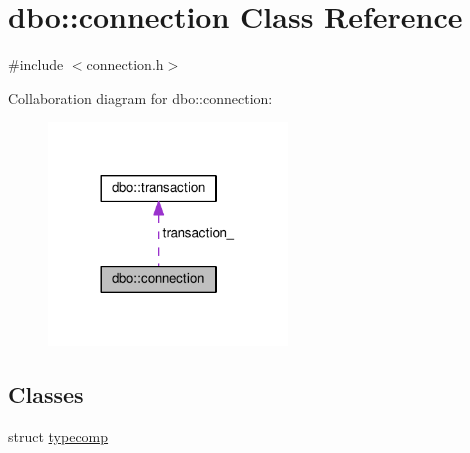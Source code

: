 \hypertarget{classdbo_1_1connection}{\section{dbo\+:\+:connection Class Reference}
\label{classdbo_1_1connection}
}


{\ttfamily \#include $<$connection.\+h$>$}



Collaboration diagram for dbo\+:\+:connection\+:\nopagebreak
\begin{figure}[H]
\begin{center}
\leavevmode
\includegraphics[width=180pt]{classdbo_1_1connection__coll__graph}
\end{center}
\end{figure}
\subsection*{Classes}
\begin{DoxyCompactItemize}
\item 
struct \hyperlink{structdbo_1_1connection_1_1typecomp}{typecomp}
\end{DoxyCompactItemize}
